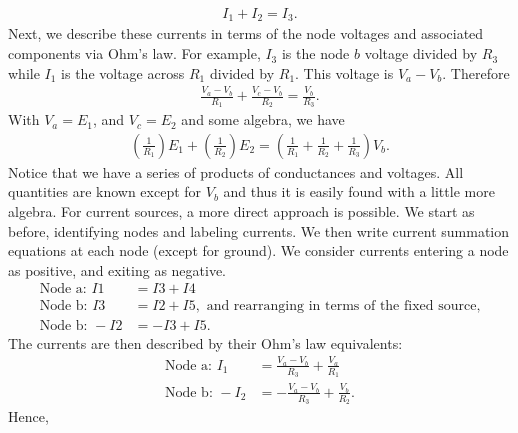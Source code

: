 \documentclass{report}
\begin{document}
\begin{itemize}
            \begin{align*}
                I_{1} + I_{2} = I_{3}
            .\end{align*}
            Next, we describe these currents in terms of the node voltages and associated components via Ohm's law. For example, $I_{3}$ is the node $b$ voltage divided by $R_{3}$ while $I_{1}$ is the voltage across $R_{1}$ divided by $R_{1}$. This voltage is $V_{a} - V_{b}$. Therefore
            \begin{align*}
                \frac{V_{a}-V_{b}}{R_{1}} + \frac{V_{c} - V_{b}}{R_{2}} = \frac{V_{b}}{R_{3}}
            .\end{align*}
            With $V_{a} = E_{1}$, and $V_{c} = E_{2}$ and some algebra, we have
            \begin{align*}
               \left(\frac{1}{R_{1}}\right) E_{1} + \left(\frac{1}{R_{2}}\right)E_{2} = \left(\frac{1}{R_{1}} + \frac{1}{R_{2}} + \frac{1}{R_{3}}\right)V_{b}
            .\end{align*}
            Notice that we have a series of products of conductances and voltages. All quantities are known except for $V_{b}$ and thus it is easily found with a little more algebra.
            \bigbreak \noindent 
            For current sources, a more direct approach is possible. We start as before, identifying nodes and labeling currents.
            \bigbreak \noindent 
            \bigbreak \noindent 
            We then write current summation equations at each node (except for ground). We consider currents entering a node as positive, and exiting as negative.
            \begin{align*}
                \text{Node a: } I1 &= I3 + I4 \\
                \text{Node b: } I3 &= I2 + I5, \text{ and rearranging in terms of the fixed source,} \\
                \text{Node b: } -I2 &= -I3 + I5
            .\end{align*}
            The currents are then described by their Ohm's law equivalents:
            \begin{align*}
                \text{Node a: } I_{1} &= \frac{V_{a} - V_{b}}{R_{3}} + \frac{V_{a}}{R_{1}} \\
                \text{Node b: } -I_{2} &= -\frac{V_{a} - V_{b}}{R_{3}} + \frac{V_{b}}{R_{2}}
            .\end{align*}
            Hence,
            \begin{align*}

\end{align*}
\end{itemize}
\end{document}
